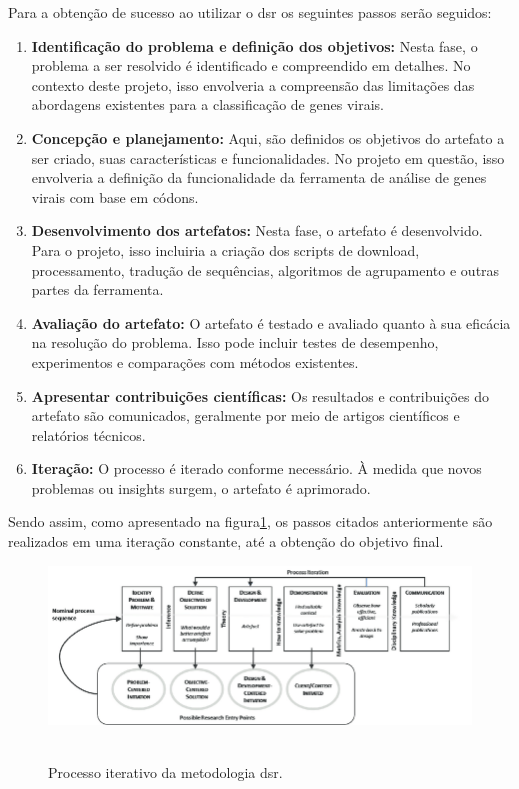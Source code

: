 Para a obtenção de sucesso ao utilizar o \gls{dsr} os seguintes passos serão seguidos:
\begin{enumerate}
  \item \textbf{Identificação do problema e definição dos objetivos:} Nesta fase, o problema a ser resolvido é identificado e compreendido em detalhes. No contexto deste projeto, isso envolveria a compreensão das limitações das abordagens existentes para a classificação de genes virais.
  \item \textbf{Concepção e planejamento:} Aqui, são definidos os objetivos do artefato a ser criado, suas características e funcionalidades. No projeto em questão, isso envolveria a definição da funcionalidade da ferramenta de análise de genes virais com base em códons.
  \item \textbf{Desenvolvimento dos artefatos:} Nesta fase, o artefato é desenvolvido. Para o projeto, isso incluiria a criação dos scripts de download, processamento, tradução de sequências, algoritmos de agrupamento e outras partes da ferramenta.
  \item \textbf{Avaliação do artefato:} O artefato é testado e avaliado quanto à sua eficácia na resolução do problema. Isso pode incluir testes de desempenho, experimentos e comparações com métodos existentes.
  \item \textbf{Apresentar contribuições científicas:} Os resultados e contribuições do artefato são comunicados, geralmente por meio de artigos científicos e relatórios técnicos.
  \item \textbf{Iteração:} O processo é iterado conforme necessário. À medida que novos problemas ou insights surgem, o artefato é aprimorado.
\end{enumerate}

Sendo assim, como apresentado na figura\ref{fig:processoDSR}, os passos citados anteriormente são realizados em uma iteração constante, até a obtenção do objetivo final.

\begin{figure}[htb]
  \centering
  \caption{Processo iterativo da metodologia \gls{dsr}.}
  \includegraphics[scale=0.6]{figuras/Design-Science-Research.png}
  ~\label{fig:processoDSR}
\end{figure}

